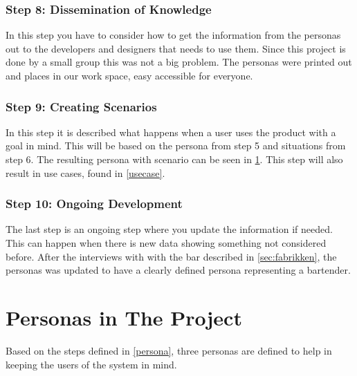 \subsubsection{Step 8: Dissemination of Knowledge}
In this step you have to consider how to get the information from the personas out to the developers and designers that needs to use them. Since this project is done by a small group this was not a big problem. The personas were printed out and places in our work space, easy accessible for everyone.

\subsubsection{Step 9: Creating Scenarios}
In this step it is described what happens when a user uses the product with a goal in mind. This will be based on the persona from step 5 and situations from step 6. The resulting persona with scenario can be seen in \cref{akkpersona}. This step will also result in use cases, found in \cref{usecase}.

\subsubsection{Step 10: Ongoing Development}
The last step is an ongoing step where you update the information if needed. This can happen when there is new data showing something not considered before. After the interviews with with the bar described in \cref{sec:fabrikken}, the personas was updated to have a clearly defined persona representing a bartender.

\section{Personas in The Project}
\label{akkpersona}

Based on the steps defined in \cref{persona}, three personas are
defined to help in keeping the users of the system in mind.




